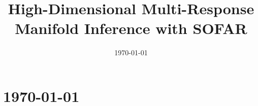 \documentclass[11pt]{report}
\title{High-Dimensional Multi-Response Manifold Inference with SOFAR}
\author{}
\date{\today}
\begin{document}
\maketitle
\tableofcontents

\chapter{\today}


% 



\end{document}

